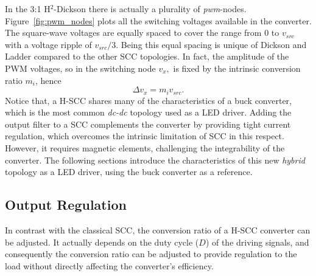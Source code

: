 In the 3:1 H$^2$-Dickson there is actually a plurality of \emph{pwm}-nodes. Figure~\ref{fig:pwm_nodes} plots all the switching voltages available in the converter. The square-wave voltages are equally spaced to cover the range from 0 to $v_{src}$ with a voltage ripple of $v_{src}/3$. Being this equal spacing is unique of Dickson and Ladder compared to the other SCC topologies. In fact, the amplitude of the PWM voltages, so in the switching node $v_x,$ is fixed by the intrinsic conversion ratio $m_i$, hence
\begin{equation}
\Delta v_{x} = m_i v_{src}.
\label{eq:del_vx}
\end{equation}
Notice that, a H-SCC shares many of the characteristics of a buck converter, which is the most common \emph{dc-dc} topology used as a LED driver. Adding the output filter to a SCC complements the converter by providing tight current regulation, which overcomes the intrinsic limitation of SCC in this respect. However, it requires magnetic elements, challenging the integrability  of the converter. The following sections introduce the characteristics of this new \emph{hybrid} topology as a LED driver, using the buck converter as a reference. %

\subsection{Output Regulation}
\label{sec:out_reg}
In contrast with the classical SCC, the conversion ratio of a H-SCC converter can be adjusted. It actually depends on the duty cycle ($D$) of the driving signals, and consequently the conversion ratio can be adjusted to provide regulation to the load without directly affecting the converter's efficiency.

